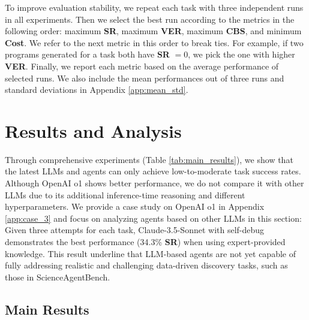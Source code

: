 \documentclass{article} %
\newcommand{\bench}{ScienceAgentBench\xspace}
\begin{document}
%
To improve evaluation stability, we repeat each task with three independent runs in all experiments.
Then we select the best run according to the metrics in the following order: maximum \textbf{SR}, maximum \textbf{VER}, maximum \textbf{CBS}, and minimum \textbf{Cost}.
We refer to the next metric in this order to break ties.
For example, if two programs generated for a task both have \textbf{SR} $= 0$, we pick the one with higher \textbf{VER}.
Finally, we report each metric based on the average performance of selected runs. 
We also include the mean performances out of three runs and standard deviations in Appendix \ref{app:mean_std}.
%

\section{Results and Analysis}
\label{sec:results}

%
Through comprehensive experiments (Table \ref{tab:main_results}), we show that the latest LLMs and agents can only achieve low-to-moderate task success rates.
Although OpenAI o1 shows better performance, we do not compare it with other LLMs due to its additional inference-time reasoning and different hyperparameters. 
We provide a case study on OpenAI o1 in Appendix \ref{app:case_3} and focus on analyzing agents based on other LLMs in this section:
Given three attempts for each task, Claude-3.5-Sonnet with self-debug demonstrates the best performance (34.3\% \textbf{SR}) when using expert-provided knowledge.
This result underline that LLM-based agents are not yet capable of fully addressing realistic and challenging data-driven discovery tasks, such as those in \bench.
%

\subsection{Main Results}
\label{sec:main_results}
\end{document}
